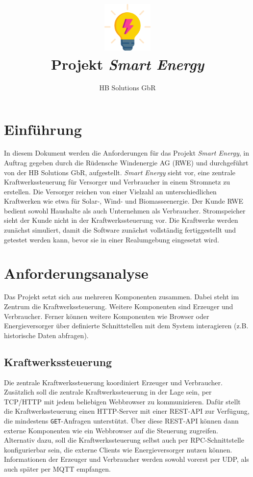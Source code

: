 \documentclass[
    fontsize=12pt,
    parskip=half
]{scrartcl}
\title{\includegraphics[height=25mm]{icon.png}\\Projekt \emph{Smart Energy}}
\author{HB Solutions GbR}
\begin{document}
\maketitle

\section{Einführung}
In diesem Dokument werden die Anforderungen für das Projekt \emph{Smart Energy}, in Auftrag gegeben durch die Rüdensche Windenergie AG (RWE) und durchgeführt von der HB Solutions GbR, aufgestellt.
\emph{Smart Energy} sieht vor, eine zentrale Kraftwerkssteuerung für Versorger und Verbraucher in einem Stromnetz zu erstellen.
Die Versorger reichen von einer Vielzahl an unterschiedlichen Kraftwerken wie etwa für Solar-, Wind- und Biomasseenergie.
Der Kunde RWE bedient sowohl Haushalte als auch Unternehmen als Verbraucher.
Stromspeicher sieht der Kunde nicht in der Kraftwerkssteuerung vor.
Die Kraftwerke werden zunächst simuliert, damit die Software zunächst vollständig fertiggestellt und getestet werden kann, bevor sie in einer Realumgebung eingesetzt wird.

\section{Anforderungsanalyse}
Das Projekt setzt sich aus mehreren Komponenten zusammen.
Dabei steht im Zentrum die Kraftwerkssteuerung.
Weitere Komponenten sind Erzeuger und Verbraucher.
Ferner können weitere Komponenten wie Browser oder Energieversorger über definierte Schnittstellen mit dem System interagieren (z.B. historische Daten abfragen).

\subsection{Kraftwerkssteuerung}
Die zentrale Kraftwerkssteuerung koordiniert Erzeuger und Verbraucher.
Zusätzlich soll die zentrale Kraftwerkssteuerung in der Lage sein, per TCP/HTTP mit jedem beliebigen Webbrowser zu kommunizieren.
Dafür stellt die Kraftwerkssteuerung einen HTTP-Server mit einer REST-API zur Verfügung, die mindestens \texttt{GET}-Anfragen unterstützt.
Über diese REST-API können dann externe Komponenten wie ein Webbrowser auf die Steuerung zugreifen.
Alternativ dazu, soll die Kraftwerkssteuerung selbst auch per RPC-Schnittstelle konfigurierbar sein, die externe Clients wie Energieversorger nutzen können.
Informationen der Erzeuger und Verbraucher werden sowohl vorerst per UDP, als auch später per MQTT empfangen. 
\end{document}
